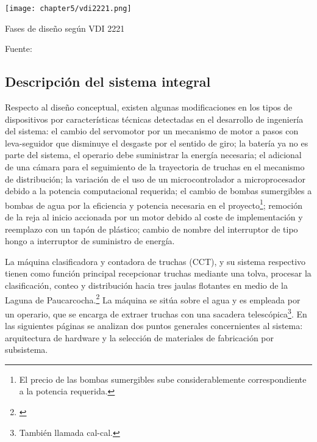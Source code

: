 \begin{myfigure}[H]
	\footnotesize\centering
	\texttt{[image: chapter5/vdi2221.png]}
	\caption{Fases de diseño según VDI 2221}
	\begin{myflushcenter}
		Fuente: \cite{Pahl2007}
	\end{myflushcenter}
	\label{fig:vdi2221}
\end{myfigure}



\subsection{Descripción del sistema integral}
\label{ssec:descripcion del sistema integral}

Respecto al diseño conceptual, existen algunas modificaciones en los tipos de dispositivos por características técnicas detectadas en el desarrollo de ingeniería del sistema: el cambio del servomotor por un mecanismo de motor a pasos con leva-seguidor que disminuye el desgaste por el sentido de giro; la batería ya no es parte del sistema, el operario debe suministrar la energía necesaria; el adicional de una cámara para el seguimiento de la trayectoria de truchas en el mecanismo de distribución; la variación de el uso de un microcontrolador a microprocesador debido a la potencia computacional requerida; el cambio de bombas sumergibles a bombas de agua por la eficiencia y potencia necesaria en el proyecto\footnote{El precio de las bombas sumergibles sube considerablemente correspondiente a la potencia requerida.}; remoción de la reja al inicio accionada por un motor debido al coste de implementación y reemplazo con un tapón de plástico; cambio de nombre del interruptor de tipo hongo a interruptor de suministro de energía. %

La máquina clasificadora y contadora de truchas (CCT), y su sistema respectivo tienen como función principal recepcionar truchas mediante una tolva, procesar la clasificación, conteo y distribución hacia tres jaulas flotantes en medio de la Laguna de Paucarcocha.\footnote{\cite{DiazVergara2020}} La máquina se sitúa sobre el agua y es empleada por un operario, que se encarga de extraer truchas con una sacadera telescópica\footnote{También llamada cal-cal.}. En las siguientes páginas se analizan dos puntos generales concernientes al sistema: arquitectura de hardware y la selección de materiales de fabricación por subsistema.

